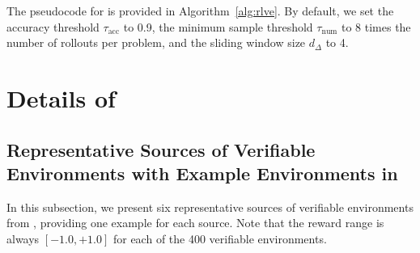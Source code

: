 \documentclass{article}
\theoremstyle{plain}
\theoremstyle{definition}
\theoremstyle{remark}
\begin{document}
The pseudocode for \ours{} is provided in Algorithm~\ref{alg:rlve}.
By default, we set the accuracy threshold $\tau_{\mathrm{acc}}$ to 0.9, the minimum sample threshold $\tau_{\mathrm{num}}$ to 8 times the number of rollouts per problem, and the sliding window size $d_{\Delta}$ to 4.





\section{Details of \suite{}}
\label{app:suite}
\subsection{Representative Sources of Verifiable Environments with Example Environments in \suite{}}
\label{app:environment-example}

In this subsection, we present six representative sources of verifiable environments from \suite{}, providing one example for each source.
Note that the reward range is always $[-1.0,+1.0]$ for each of the 400 verifiable environments.
\end{document}
